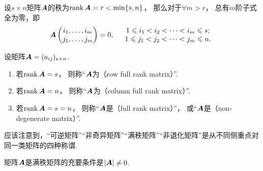 \begin{property}\label{theorem:线性方程组.矩阵的秩的性质3}
设\(s \times n\)矩阵\(\boldsymbol{A}\)的秩为\(\rank\boldsymbol{A} = r < \min\{s,n\}\)，
那么对于\(\forall m > r\)，
总有\(m\)阶子式全为零，即\[
	\A\begin{pmatrix}
		\AutoTuple{i}{m} \\
		\AutoTuple{j}{m}
	\end{pmatrix} = 0,
	\quad
	\begin{array}{c}
		1 \leqslant i_1 < i_2 < \dotsb < i_m \leqslant s; \\
		1 \leqslant j_1 < j_2 < \dotsb < j_m \leqslant n.
	\end{array}
\]
\end{property}

\begin{definition}
设矩阵\(\boldsymbol{A} = (a_{ij})_{s \times n}\).
\begin{enumerate}
	\item 若\(\rank\boldsymbol{A} = s\)，
	则称“\(\boldsymbol{A}\)为（row full rank matrix）”.
	\item 若\(\rank\boldsymbol{A} = n\)，
	则称“\(\boldsymbol{A}\)为（column full rank matrix）”.
	\item 若\(\rank\boldsymbol{A} = s = n\)，
	则称“\(\boldsymbol{A}\)是（full rank matrix）”，
	或“\(\boldsymbol{A}\)是（non-degenerate matrix）”.
\end{enumerate}
\end{definition}

应该注意到，“可逆矩阵”“非奇异矩阵”“满秩矩阵”“非退化矩阵”是从不同侧重点对同一类矩阵的四种称谓.

\begin{property}\label{theorem:线性方程组.矩阵的秩的性质4}
矩阵\(\boldsymbol{A}\)是满秩矩阵的充要条件是\(\abs{\boldsymbol{A}}\neq0\).
\end{property}

